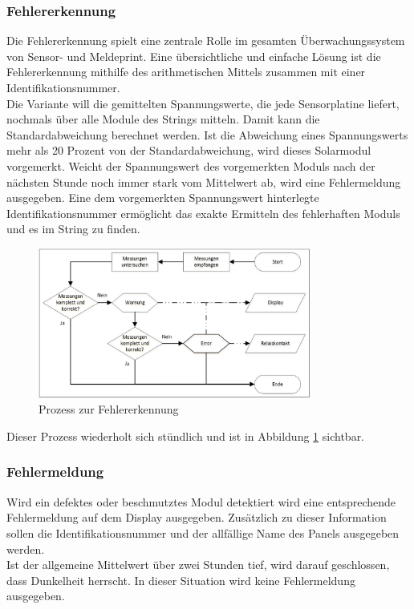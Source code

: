 \subsubsection{Fehlererkennung}
Die Fehlererkennung spielt eine zentrale Rolle im gesamten Überwachungssystem von Sensor- und Meldeprint. Eine übersichtliche und einfache Lösung ist die Fehlererkennung mithilfe des arithmetischen Mittels zusammen mit einer Identifikationsnummer.\\
Die Variante will die gemittelten Spannungswerte, die jede Sensorplatine liefert, nochmals über alle Module des Strings mitteln. Damit kann die Standardabweichung berechnet werden. Ist die Abweichung eines Spannungswerts mehr als 20 Prozent von der Standardabweichung, wird dieses Solarmodul vorgemerkt. Weicht der Spannungswert des vorgemerkten Moduls nach der nächsten Stunde noch immer stark vom Mittelwert ab, wird eine Fehlermeldung ausgegeben. Eine dem vorgemerkten Spannungswert hinterlegte Identifikationsnummer ermöglicht das exakte Ermitteln des fehlerhaften Moduls und es im String zu finden.
\begin{figure}[htbp] 
  \centering
     \includegraphics[width=0.8\textwidth]{graphics/error-warning-scheme}
  \caption{Prozess zur Fehlererkennung}
  \label{fig:error-warning-scheme}
\end{figure}
Dieser Prozess wiederholt sich stündlich und ist in Abbildung \ref{fig:error-warning-scheme} sichtbar.
\subsubsection{Fehlermeldung}
Wird ein defektes oder beschmutztes Modul detektiert wird eine entsprechende Fehlermeldung auf dem Display ausgegeben. Zusätzlich zu dieser Information sollen die Identifikationsnummer und der allfällige Name des Panels ausgegeben werden.\\
Ist der allgemeine Mittelwert über zwei Stunden tief, wird darauf geschlossen, dass Dunkelheit herrscht. In dieser Situation wird keine Fehlermeldung ausgegeben.
